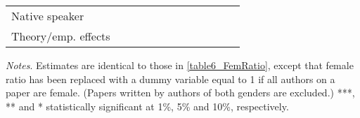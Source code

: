 \begin{sidewaystable}
\begin{threeparttable}
\begin{tabular}{p{3cm}S@{}S@{}S@{}S@{}S@{}S@{}S@{}S@{}S@{}S@{}S@{}}
            Native speaker                &               &           {}   &               &           {}   &               &           {}   &               &           {}   &               &               &               \\
            Theory/emp. effects           &               &           {}   &               &           {}   &               &           {}   &               &           {}   &               &               &               \\
            \bottomrule
        \end{tabular}
        \begin{tablenotes}
            \tiny
            \item \textit{Notes}. Estimates are identical to those in \autoref{table6_FemRatio}, except that female ratio has been replaced with a dummy variable equal to 1 if all authors on a paper are female. (Papers written by authors of both genders are excluded.) ***, ** and * statistically significant at 1\%, 5\% and 10\%, respectively.
        \end{tablenotes}
    \end{threeparttable}

\end{sidewaystable}
